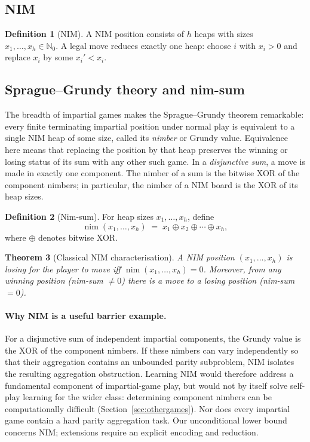 \documentclass[11pt]{article}
\newcommand{\N}{\mathbb{N}}
\theoremstyle{plain}
\newtheorem{theorem}{Theorem}[section]
\theoremstyle{definition}
\newtheorem{definition}[theorem]{Definition}
\theoremstyle{remark}
\numberwithin{equation}{section}
\begin{document}
\subsection{NIM}
\begin{definition}[NIM]
\label{def:nim}
A NIM position consists of $h$ heaps with sizes $x_1,\dots,x_h\in\N_0$. A legal move reduces exactly one heap: choose $i$ with $x_i>0$ and replace $x_i$ by some $x_i'<x_i$.
\end{definition}

\subsection{Sprague--Grundy theory and nim-sum}
The breadth of impartial games makes the Sprague--Grundy theorem remarkable: every finite terminating impartial position under normal play is equivalent to a single NIM heap of some size, called its \emph{nimber} or Grundy value. Equivalence here means that replacing the position by that heap preserves the winning or losing status of its sum with any other such game. In a \emph{disjunctive sum}, a move is made in exactly one component. The nimber of a sum is the bitwise XOR of the component nimbers; in particular, the nimber of a NIM board is the XOR of its heap sizes.

\begin{definition}[Nim-sum]
\label{def:nimsum}
For heap sizes $x_1,\dots,x_h$, define
\[
\operatorname{nim}(x_1,\dots,x_h) \;=\; x_1 \oplus x_2 \oplus \cdots \oplus x_h,
\]
where $\oplus$ denotes bitwise XOR.
\end{definition}

\begin{theorem}[Classical NIM characterisation]
\label{thm:nim-win}
A NIM position $(x_1,\dots,x_h)$ is losing for the player to move iff $\operatorname{nim}(x_1,\dots,x_h)=0$. Moreover, from any winning position (nim-sum $\neq 0$) there is a move to a losing position (nim-sum $=0$).
\end{theorem}

\paragraph{Why NIM is a useful barrier example.}
For a disjunctive sum of independent impartial components, the Grundy value is the XOR of the component nimbers. If these nimbers can vary independently so that their aggregation contains an unbounded parity subproblem, NIM isolates the resulting aggregation obstruction.
Learning NIM would therefore address a fundamental component of impartial-game play, but would not by itself solve self-play learning for the wider class: determining component nimbers can be computationally difficult (Section~\ref{sec:othergames}). Nor does every impartial game contain a hard parity aggregation task. Our unconditional lower bound concerns NIM; extensions require an explicit encoding and reduction.
\end{document}
